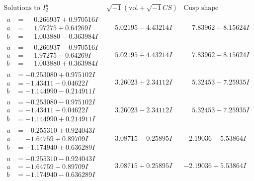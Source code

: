 \documentclass[1p]{elsarticle_modified}
\theoremstyle{definition}
\newcommand{\I}{\sqrt{-1}}
\begin{document}
$$\begin{array}{c|c|c}  
\text{Solutions to }I^u_{2}& \I (\text{vol} + \sqrt{-1}CS) & \text{Cusp shape}\\
 \hline 
\begin{aligned}
u &= \phantom{-}0.266937 + 0.970516 I \\
a &= \phantom{-}1.97275 + 0.64269 I \\
b &= \phantom{-}1.003880 - 0.363984 I\end{aligned}
 & \phantom{-}5.02195 - 4.43214 I & \phantom{-}7.83962 + 8.15624 I \\ \hline\begin{aligned}
u &= \phantom{-}0.266937 - 0.970516 I \\
a &= \phantom{-}1.97275 - 0.64269 I \\
b &= \phantom{-}1.003880 + 0.363984 I\end{aligned}
 & \phantom{-}5.02195 + 4.43214 I & \phantom{-}7.83962 - 8.15624 I \\ \hline\begin{aligned}
u &= -0.253080 + 0.975102 I \\
a &= -1.43411 - 0.04622 I \\
b &= -1.144990 - 0.214911 I\end{aligned}
 & \phantom{-}3.26023 + 2.34112 I & \phantom{-}5.32453 - 7.25935 I \\ \hline\begin{aligned}
u &= -0.253080 - 0.975102 I \\
a &= -1.43411 + 0.04622 I \\
b &= -1.144990 + 0.214911 I\end{aligned}
 & \phantom{-}3.26023 - 2.34112 I & \phantom{-}5.32453 + 7.25935 I \\ \hline\begin{aligned}
u &= -0.255310 + 0.924043 I \\
a &= -1.64759 + 0.89709 I \\
b &= -1.174940 + 0.636289 I\end{aligned}
 & \phantom{-}3.08715 - 0.25895 I & -2.19036 - 5.53864 I \\ \hline\begin{aligned}
u &= -0.255310 - 0.924043 I \\
a &= -1.64759 - 0.89709 I \\
b &= -1.174940 - 0.636289 I\end{aligned}
 & \phantom{-}3.08715 + 0.25895 I & -2.19036 + 5.53864 I \\ \hline\begin{aligned}

\end{aligned}
\end{array}$$
\end{document}
